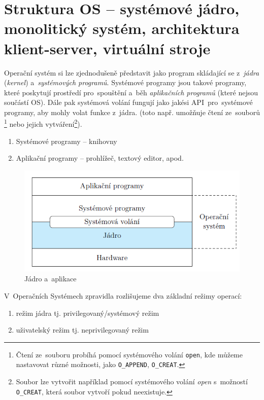 
\section{Struktura OS -- systémové jádro, monolitický systém, architektura klient-server, virtuální stroje}
\label{kernel}

Operační systém si lze zjednodušeně představit jako program skládající se z~\emph{jádra} (\emph{kernel}) a~\emph{systémových programů}. Systémové programy jsou takové programy, které poskytují prostředí pro~spouštění a~běh \emph{aplikačních programů} (které nejsou součástí OS). Dále pak systémová volání fungují jako jakési API~pro~systémové programy, aby mohly volat funkce z~jádra. (toto např. umožňuje čtení ze~souborů \footnote{Čtení ze~souboru probíhá pomocí systémového volání \texttt{open}, kde můžeme nastavovat různé možnosti, jako \texttt{O\_APPEND}, \texttt{O\_CREAT}.} nebo jejich vytváření\footnote{Soubor lze vytvořit například pomocí systémového volání \emph{open} s~možností \texttt{O\_CREAT}, která soubor vytvoří pokud neexistuje.}).

\begin{enumerate}[noitemsep]
	\item Systémové programy -- knihovny
	\item Aplikační programy -- prohlížeč, textový editor, apod. 
\end{enumerate}

\begin{figure}[ht]
	\centering
	\includegraphics[scale=1]{images/OS_kernel_apps.png}
	\caption{Jádro a~aplikace}
	\label{OS_kernel_apps}
\end{figure}

V~Operačních Systémech zpravidla rozlišujeme dva základní režimy operací:

\begin{enumerate}[noitemsep]
	\item režim jádra tj. privilegovaný/systémový režim
	\item uživatelský režim tj. neprivilegovaný režim
\end{enumerate}

